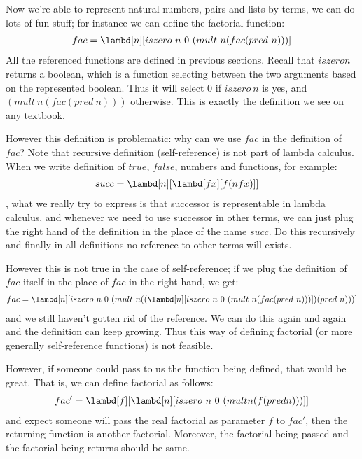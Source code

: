 \documentclass[../../../include/open-logic-section]{subfiles}
\begin{document}


Now we're able to represent natural numbers, pairs and
lists by terms, we can do lots of fun stuff; for instance we can
define the factorial function:
\begin{align*}
  fac = \lambd[n][iszero ~ n ~ 0 ~ (mult ~ n (fac (pred ~ n)))]
\end{align*}
All the referenced functions are defined in previous sections.
Recall that $iszero n$ returns a boolean, which is a function
selecting between the two arguments based on the represented boolean.
Thus it will select $0$ if $iszero ~ n$ is yes, and $(mult ~ n (fac
(pred ~ n)))$ otherwise. This is exactly the definition we see on any
textbook.

However this definition is problematic: why can we use $fac$ in the
definition of $fac$? Note that recursive definition (self-reference)
is not part of lambda calculus. When we write definition of $true$,
$false$, numbers and functions, for example:
\begin{align*}
    {succ} &= \lambd[{n}][\lambd[fx][f ({n} f x)]]
\end{align*}
, what we really try to express is that successor is representable in
lambda calculus, and whenever we need to use successor in other
terms, we can just plug the right hand of the definition in the place
of the name $succ$. Do this recursively and finally in all definitions
no reference to other terms will exists. 

However this is not true in the case of self-reference; if we plug the
definition of $fac$ itself in the place of $fac$ in the right hand, we
get:
\begin{align*}
  fac = \lambd[n][iszero ~ n ~ 0 ~ (mult ~ n ((\lambd[n][iszero ~ n ~
  0 ~ (mult ~ n (fac (pred ~ n)))]) (pred ~ n)))]
\end{align*}
and we still haven't gotten rid of the reference. We can do this again
and again and the definition can keep growing. Thus this way of
defining factorial (or more generally self-reference functions) is not
feasible.

However, if someone could pass to us the function being defined, that
would be great. That is, we can define factorial as follows:
\begin{align*}
  fac' = \lambd[f][\lambd[n][iszero ~ n ~ 0 ~ (mult n (f (pred n)))]]
\end{align*}
and expect someone will pass the real factorial as parameter $f$ to $fac'$, then
the returning function is another factorial. Moreover, the factorial
being passed and the factorial being returns should be same.
\end{document}
